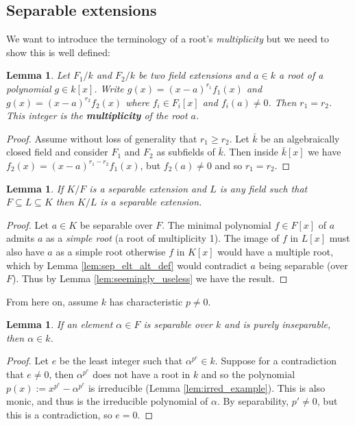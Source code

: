 \documentclass[12pt]{article}
\theoremstyle{plain}
\newtheorem{lemma}[thm]{Lemma}
\theoremstyle{definition}
\begin{document}
	\subsection{Separable extensions}
	We want to introduce the terminology of a root's \emph{multiplicity} but we need to show this is well defined:
	\begin{lemma}
		Let $F_1/k$ and $F_2/k$ be two field extensions and $a \in k$ a root of a polynomial $g \in k[x]$. Write $g(x) = (x - a)^{r_1}f_1(x)$ and $g(x) = (x-a)^{r_2}f_2(x)$ where $f_i \in F_i[x]$ and $f_i(a) \neq 0$. Then $r_1 = r_2$. This integer is the \textbf{multiplicity} of the root $a$.
	\end{lemma}
	\begin{proof}
		Assume without loss of generality that $r_1 \geq r_2$. Let $\bar{k}$ be an algebraically closed field and consider $F_1$ and $F_2$ as subfields of $\bar{k}$. Then inside $\bar{k}[x]$ we have $f_2(x) = (x-a)^{r_1 - r_2}f_1(x)$, but $f_2(a) \neq 0$ and so $r_1 = r_2$.
	\end{proof}
	\begin{lemma}
		\label{lem:sep_ext_trans_sort_of}
		If $K/F$ is a separable extension and $L$ is any field such that $F \subseteq L \subseteq K$ then $K/L$ is a separable extension.
	\end{lemma}
	\begin{proof}
		Let $a \in K$ be separable over $F$. The minimal polynomial $f \in F[x]$ of $a$ admits $a$ as a \emph{simple root} (a root of multiplicity 1). The image of $f$ in $L[x]$ must also have $a$ as a simple root otherwise $f$ in $K[x]$ would have a multiple root, which by Lemma \ref{lem:sep_elt_alt_def} would contradict $a$ being separable (over $F$). Thus by Lemma \ref{lem:seemingly_useless} we have the result.
	\end{proof}
	From here on, assume $k$ has characteristic $p \neq 0$.
	\begin{lemma}
		\label{lem:insep_purely_sep}
		If an element $\alpha \in F$ is separable over $k$ and is purely inseparable, then $\alpha \in k$.
	\end{lemma}
	\begin{proof}
		Let $e$ be the least integer such that $\alpha^{p^e} \in k$. Suppose for a contradiction that $e \neq 0$, then $\alpha^{p^e}$ does not have a root in $k$ and so the polynomial $p(x) := x^{p^e} - \alpha^{p^e}$ is irreducible (Lemma \ref{lem:irred_example}). This is also monic, and thus is the irreducible polynomial of $\alpha$. By separability, $p' \neq 0$, but this is a contradiction, so $e = 0$.
	\end{proof}
\end{document}
